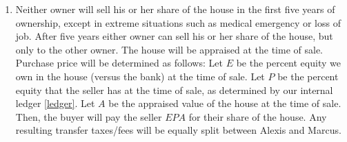 \documentclass[12pt]{article}
\begin{document}
\begin{enumerate}
\item Neither owner will sell his or her share of the house in the 
first five years of ownership, except in extreme situations such as 
medical emergency or loss of job. After five years either owner can 
sell his or her share of the house, but only to the other owner. The 
house will be appraised at the time of sale. Purchase price will be 
determined as follows: Let $E$ be the percent equity we own in the 
house (versus the bank) at the time of sale. Let $P$ be the percent 
equity that the seller has at the time of sale, as determined by our 
internal ledger \autoref{ledger}. Let $A$ be the appraised value of 
the house at the time of sale. Then, the buyer will pay the seller 
$EPA$ for their share of the house. Any resulting transfer 
taxes/fees will be equally split between Alexis and Marcus.
 
\end{enumerate}
\end{document}

